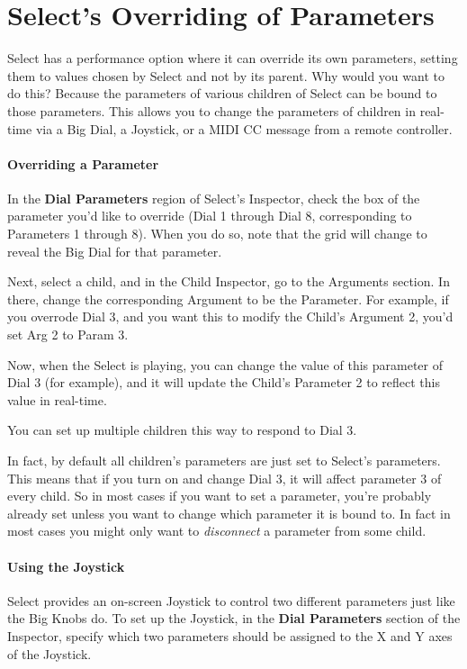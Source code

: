 \documentclass[twoside,10pt]{article}
\begin{document}
\section{Select's Overriding of Parameters}
\label{selectparameters}

Select has a performance option where it can override its own parameters, setting them to values chosen by Select and not by its parent.  Why would you want to do this?  Because the parameters of various children of Select can be bound to those parameters.  This allows you to change the parameters of children in real-time via a Big Dial, a Joystick, or a MIDI CC message from a remote controller.

\paragraph{Overriding a Parameter}

In the {\bf Dial Parameters} region of Select's Inspector, check the box of the parameter you'd like to override (Dial 1 through Dial 8, corresponding to Parameters 1 through 8).  When you do so, note that the grid will change to reveal the Big Dial for that parameter.

Next, select a child, and in the Child Inspector, go to the Arguments section.  In there, change the corresponding Argument to be the Parameter.  For example, if you overrode Dial 3, and you want this to modify the Child's Argument 2, you'd set Arg 2 to Param 3.  

Now, when the Select is playing, you can change the value of this parameter of Dial 3 (for example), and it will update the Child's Parameter 2 to reflect this value in real-time.

You can set up multiple children this way to respond to Dial 3.

In fact, by default all children's parameters are just set to Select's parameters.  This means that if you turn on and change Dial 3, it will affect parameter 3 of every child.  So in most cases if you want to set a parameter, you're probably already set unless you want to change which parameter it is bound to.  In fact in most cases you might only want to {\it disconnect} a parameter from some child.

\paragraph{Using the Joystick}
Select provides an on-screen Joystick to control two different parameters just like the Big Knobs do.  To set up the Joystick, in the {\bf Dial Parameters} section of the Inspector, specify which two parameters should be assigned to the X and Y axes of the Joystick.
\end{document}
